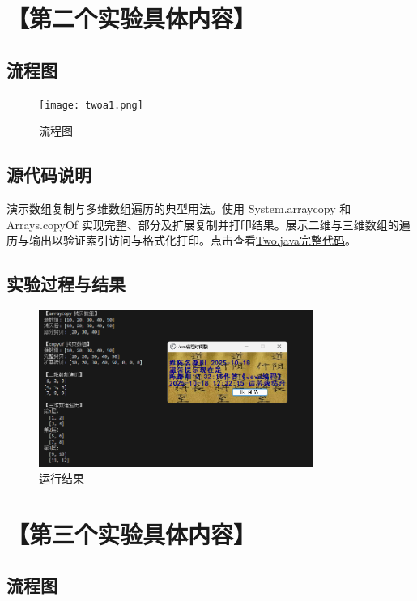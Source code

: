 \documentclass[12pt,a4paper]{article}
\begin{document}
\section*{【第二个实验具体内容】}
\subsection*{流程图}

\begin{figure}[H]
\centering
\texttt{[image: twoa1.png]}
\caption{流程图}
\end{figure}

\subsection*{源代码说明}
演示数组复制与多维数组遍历的典型用法。使用 System.arraycopy 和 Arrays.copyOf 实现完整、部分及扩展复制并打印结果。展示二维与三维数组的遍历与输出以验证索引访问与格式化打印。点击查看\hyperref[sec:two]{Two.java完整代码}。

\subsection*{实验过程与结果}

\begin{figure}[H]
\centering
\includegraphics[width=0.8\textwidth,height=0.8\textheight,keepaspectratio]{twoa.png}
\caption{运行结果}
\end{figure}

\section*{【第三个实验具体内容】}
\subsection*{流程图}
\end{document}
